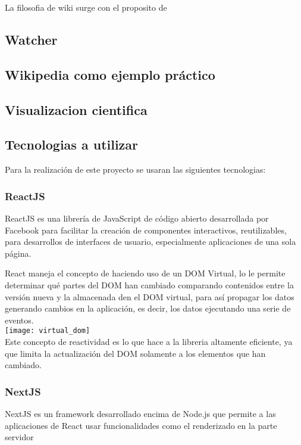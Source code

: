         La filosofia de wiki surge con el proposito de 

    \subsection{Watcher}

    \subsection{Wikipedia como ejemplo práctico}

    \subsection{Visualizacion cientifica}


\subsection{Tecnologias a utilizar}

    Para la realización de este proyecto se usaran las siguientes tecnologias:

    \subsubsection{ReactJS}

        ReactJS es una librería de JavaScript de código abierto desarrollada por Facebook para facilitar la creación de componentes interactivos, reutilizables, para desarrollos de interfaces de usuario, especialmente aplicaciones de una sola página.

        React maneja el concepto de  haciendo uso de un DOM Virtual, lo le permite determinar qué partes del DOM han cambiado comparando contenidos entre la versión nueva y la almacenada den el DOM virtual, para así propagar los datos generando cambios en la aplicación, es decir, los datos  ejecutando una serie de eventos.\\

        \texttt{[image: virtual\_dom]}\\

        Este concepto de reactividad es lo que hace a la libreria altamente eficiente, ya que limita la actualización del DOM solamente a los elementos que han cambiado.
        
    \subsubsection{NextJS}
        NextJS es un framework desarrollado encima de Node.js que permite a las aplicaciones de React usar funcionalidades como el renderizado en la parte servidor 

